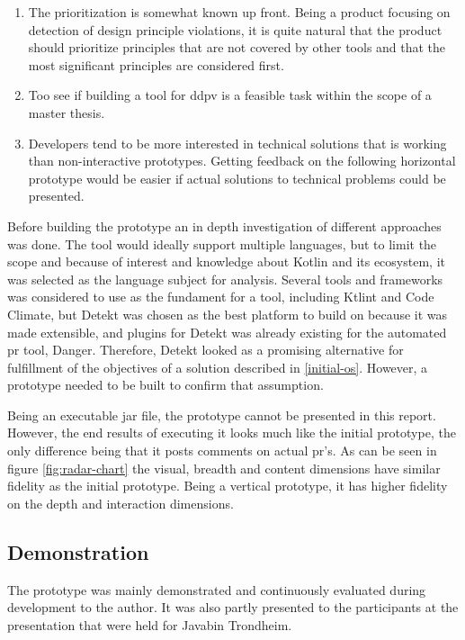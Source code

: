 \documentclass[pdftex,10pt,b5paper,twoside]{report}
\begin{document}
\begin{enumerate}
    \item The prioritization is somewhat known up front. Being a product focusing on detection of design principle violations, it is quite natural that the product should prioritize principles that are not covered by other tools and that the most significant principles are considered first.
    \item Too see if building a tool for \gls{ddpv} is a feasible task within the scope of a master thesis.
    \item Developers tend to be more interested in technical solutions that is working than non-interactive prototypes. Getting feedback on the following horizontal prototype would be easier if actual solutions to technical problems could be presented.
\end{enumerate}

Before building the prototype an in depth investigation of different approaches was done. The tool would ideally support multiple languages, but to limit the scope and because of interest and knowledge about Kotlin and its ecosystem, it was selected as the language subject for analysis. Several tools and frameworks was considered to use as the fundament for a tool, including Ktlint\cite{ktlint} and Code Climate\cite{codeclimate}, but Detekt\cite{detekt} was chosen as the best platform to build on because it was made extensible, and plugins for Detekt was already existing for the automated \gls{pr} tool\cite{danger-detekt-plugin}, Danger\cite{danger}. Therefore, Detekt looked as a promising alternative for fulfillment of the objectives of a solution described in \ref{initial-os}. However, a prototype needed to be built to confirm that assumption. 

Being an executable jar file, the prototype cannot be presented in this report. However, the end results of executing it looks much like the initial prototype, the only difference being that it posts comments on actual \gls{pr}'s. As can be seen in figure \ref{fig:radar-chart} the visual, breadth and content dimensions have similar fidelity as the initial prototype. Being a vertical prototype, it has higher fidelity on the depth and interaction dimensions.  

\subsection*{Demonstration}
The prototype was mainly demonstrated and continuously evaluated during development to the author. It was also partly presented to the participants at the presentation that were held for Javabin Trondheim.
\end{document}
